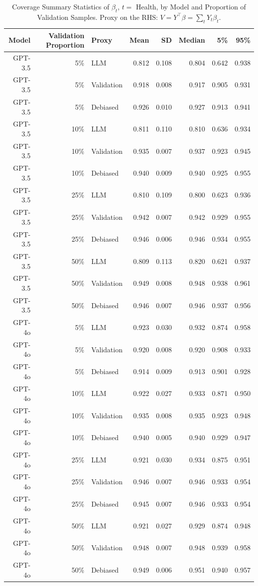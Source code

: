 \begin{table}

\caption{Coverage Summary Statistics of $\beta_{t}$, $t=$ Health, by Model and Proportion of Validation Samples. Proxy on the RHS: $V = Y^\top \beta = \sum_{t} Y_t \beta_t$.}
\centering
\begin{tabular}[t]{rrlrrrrr}
\toprule
Model & Validation Proportion & Proxy & Mean & SD & Median & 5\% & 95\%\\
\midrule
GPT-3.5 & 5\% & LLM & 0.812 & 0.108 & 0.804 & 0.642 & 0.938\\
GPT-3.5 & 5\% & Validation & 0.918 & 0.008 & 0.917 & 0.905 & 0.931\\
GPT-3.5 & 5\% & Debiased & 0.926 & 0.010 & 0.927 & 0.913 & 0.941\\
GPT-3.5 & 10\% & LLM & 0.811 & 0.110 & 0.810 & 0.636 & 0.934\\
GPT-3.5 & 10\% & Validation & 0.935 & 0.007 & 0.937 & 0.923 & 0.945\\
GPT-3.5 & 10\% & Debiased & 0.940 & 0.009 & 0.940 & 0.925 & 0.955\\
GPT-3.5 & 25\% & LLM & 0.810 & 0.109 & 0.800 & 0.623 & 0.936\\
GPT-3.5 & 25\% & Validation & 0.942 & 0.007 & 0.942 & 0.929 & 0.955\\
GPT-3.5 & 25\% & Debiased & 0.946 & 0.006 & 0.946 & 0.934 & 0.955\\
GPT-3.5 & 50\% & LLM & 0.809 & 0.113 & 0.820 & 0.621 & 0.937\\
GPT-3.5 & 50\% & Validation & 0.949 & 0.008 & 0.948 & 0.938 & 0.961\\
GPT-3.5 & 50\% & Debiased & 0.946 & 0.007 & 0.946 & 0.937 & 0.956\\
GPT-4o & 5\% & LLM & 0.923 & 0.030 & 0.932 & 0.874 & 0.958\\
GPT-4o & 5\% & Validation & 0.920 & 0.008 & 0.920 & 0.908 & 0.933\\
GPT-4o & 5\% & Debiased & 0.914 & 0.009 & 0.913 & 0.901 & 0.928\\
GPT-4o & 10\% & LLM & 0.922 & 0.027 & 0.933 & 0.871 & 0.950\\
GPT-4o & 10\% & Validation & 0.935 & 0.008 & 0.935 & 0.923 & 0.948\\
GPT-4o & 10\% & Debiased & 0.940 & 0.005 & 0.940 & 0.929 & 0.947\\
GPT-4o & 25\% & LLM & 0.921 & 0.030 & 0.934 & 0.875 & 0.951\\
GPT-4o & 25\% & Validation & 0.946 & 0.007 & 0.946 & 0.933 & 0.954\\
GPT-4o & 25\% & Debiased & 0.945 & 0.007 & 0.946 & 0.933 & 0.954\\
GPT-4o & 50\% & LLM & 0.921 & 0.027 & 0.929 & 0.874 & 0.948\\
GPT-4o & 50\% & Validation & 0.948 & 0.007 & 0.948 & 0.939 & 0.958\\
GPT-4o & 50\% & Debiased & 0.949 & 0.006 & 0.951 & 0.940 & 0.957\\
\bottomrule
\end{tabular}
\end{table}
